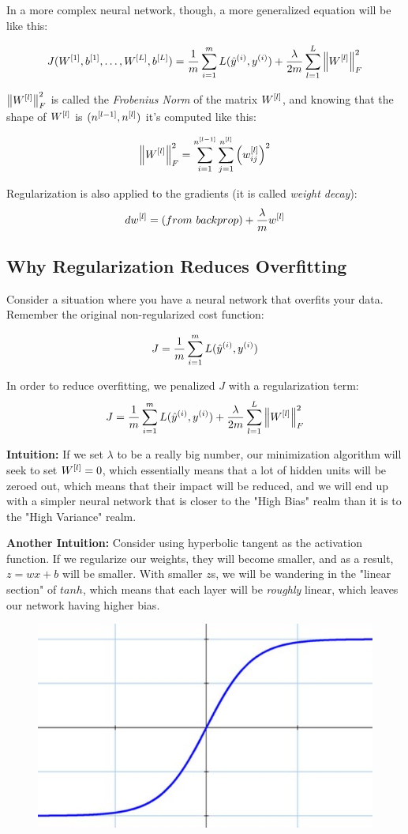 In a more complex neural network, though, a more generalized equation will be like this: 

$$
J(W^{[1]}, b^{[1]}, \dots, W^{[L]}, b^{[L]}) = \frac{1}{m}\sum_{i=1}^{m}{L(\hat{y}^{(i)}, y^{(i)})} + \frac{\lambda}{2m} \sum_{l=1}^L \left\lVert W^{[l]}\right\rVert_F^2
$$

$\left\lVert W^{[l]}\right\rVert_F^2$ is called the \emph{Frobenius Norm} of the matrix $W^{[l]}$, and knowing that the shape of $W^{[l]}$ is $(n^{[l-1]}, n^{[l]})$ it's computed like this: 

$$
\left\lVert W^{[l]}\right\rVert_F^2 = \sum_{i=1}^{n^{[l-1]}} \sum_{j=1}^{n^{[l]}} \Big(w_{ij}^{[l]}\Big)^2
$$

Regularization is also applied to the gradients (it is called \emph{weight decay}): 
$$
dw\lay{l} = (from\ backprop) + \frac{\lambda}{m}w\lay{l}
$$

\subsection{Why Regularization Reduces Overfitting}
Consider a situation where you have a neural network that overfits your data. Remember the original non-regularized cost function: 

$$
J = \frac{1}{m}\sum_{i=1}^{m} L(\hat{y}^{(i)}, y^{(i)})
$$

In order to reduce overfitting, we penalized $J$ with a regularization term: 
$$
J = \frac{1}{m}\sum_{i=1}^{m} L(\hat{y}^{(i)}, y^{(i)}) + \frac{\lambda}{2m}\sum_{l=1}^L \left\lVert W^{[l]}\right\rVert_F^2
$$

\textbf{Intuition:} If we set $\lambda$ to be a really big number, our minimization algorithm will seek to set $W^{[l]} = 0$, which essentially means that a lot of hidden units will be zeroed out, which means that their impact will be reduced, and we will end up with a simpler neural network that is closer to the "High Bias" realm than it is to the "High Variance" realm.

\textbf{Another Intuition:} Consider using hyperbolic tangent as the activation function. If we regularize our weights, they will become smaller, and as a result, $z = wx+b$ will be smaller. With smaller $z$s, we will be wandering in the "linear section" of $tanh$, which means that each layer will be \emph{roughly} linear, which leaves our network having higher bias. 

\begin{figure}[H]
    \includegraphics[scale=0.2]{images/tanh.png}
    \centering
\end{figure}